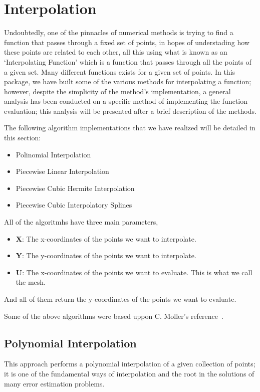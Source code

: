 \section{Interpolation}
Undoubtedly, one of the pinnacles of numerical methods is trying to find a function that passes through a fixed set of points, in hopes of understading how these points are related to each other, all this using what is known as an `Interpolating Function' which is a function that passes through all the points of a given set. Many different functions exists for a given set of points. In this package, we have built some of the various methods for interpolating a function; however, despite the simplicity of the method's implementation, a general analysis has been conducted on a specific method of implementing the function evaluation; this analysis will be presented after a brief description of the methods.

The following algorithm implementations that we have realized will be detailed in this section:
\begin{itemize}
    \item Polinomial Interpolation 
    \item Piecewise Linear Interpolation 
    \item Piecewise Cubic Hermite Interpolation 
    \item Piecewise Cubic Interpolatory Splines 
\end{itemize}

All of the algoritmhs have three main parameters, 
\begin{itemize}
    \item \textbf{X}: The x-coordinates of the points we want to interpolate.
    \item \textbf{Y}: The y-coordinates of the points we want to interpolate.
    \item \textbf{U}: The x-coordinates of the points we want to evaluate. This is what we call the mesh.
\end{itemize}
And all of them return the y-coordinates of the points we want to evaluate.

Some of the above algorithms were based uppon C. Moller's reference~\cite{doi:10.1137/1.9780898717952}.

\subsection{Polynomial Interpolation}
This approach performs a polynomial interpolation of a given collection of points; it is one of the fundamental ways of interpolation and the root in the solutions of many error estimation problems. 

